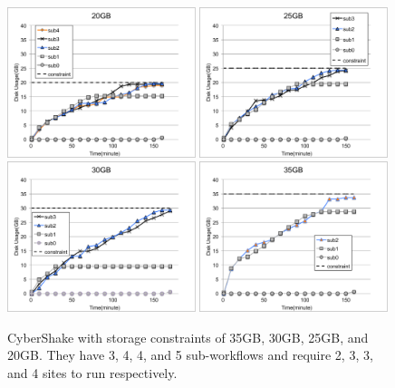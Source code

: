 




\begin{figure}[h!]
	\centering
    \includegraphics[width=0.49\textwidth]{figures/partitioning/cybershake20gb.pdf}
 \includegraphics[width=0.49\textwidth]{figures/partitioning/cybershake25gb.pdf}
 \includegraphics[width=0.49\textwidth]{figures/partitioning/cybershake30gb.pdf}
 \includegraphics[width=0.49\textwidth]{figures/partitioning/cybershake35gb.pdf}
    \caption{CyberShake with storage constraints of 35GB, 30GB, 25GB, and 20GB. They have 3, 4, 4, and 5 sub-workflows and require 2, 3, 3, and 4 sites to run respectively. }
    \label{fig:constraint}
\end{figure}

